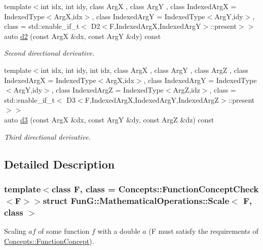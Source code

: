 \begin{DoxyCompactItemize}
{\footnotesize template$<$int idx, int idy, class Arg\-X , class Arg\-Y , class Indexed\-Arg\-X  = Indexed\-Type$<$\-Arg\-X,idx$>$, class Indexed\-Arg\-Y  = Indexed\-Type$<$\-Arg\-Y,idy$>$, class  = std\-::enable\-\_\-if\-\_\-t$<$ D2$<$\-F,\-Indexed\-Arg\-X,\-Indexed\-Arg\-Y$>$\-::present$>$$>$ }\\auto \hyperlink{structFunG_1_1MathematicalOperations_1_1Scale_a8be2b6ba1a541617acd73136467c938d}{d2} (const Arg\-X \&dx, const Arg\-Y \&dy) const 
\begin{DoxyCompactList}\small\item\em Second directional derivative. \end{DoxyCompactList}\item 
{\footnotesize template$<$int idx, int idy, int idz, class Arg\-X , class Arg\-Y , class Arg\-Z , class Indexed\-Arg\-X  = Indexed\-Type$<$\-Arg\-X,idx$>$, class Indexed\-Arg\-Y  = Indexed\-Type$<$\-Arg\-Y,idy$>$, class Indexed\-Arg\-Z  = Indexed\-Type$<$\-Arg\-Z,idz$>$, class  = std\-::enable\-\_\-if\-\_\-t$<$ D3$<$\-F,\-Indexed\-Arg\-X,\-Indexed\-Arg\-Y,\-Indexed\-Arg\-Z$>$\-::present $>$$>$ }\\auto \hyperlink{structFunG_1_1MathematicalOperations_1_1Scale_a070452119b00f2983a6e7ff7fdf890ed}{d3} (const Arg\-X \&dx, const Arg\-Y \&dy, const Arg\-Z \&dz) const 
\begin{DoxyCompactList}\small\item\em Third directional derivative. \end{DoxyCompactList}\end{DoxyCompactItemize}


\subsection{Detailed Description}
\subsubsection*{template$<$class F, class = Concepts\-::\-Function\-Concept\-Check$<$\-F$>$$>$struct Fun\-G\-::\-Mathematical\-Operations\-::\-Scale$<$ F, class $>$}

Scaling $ af $ of some function $ f $ with a double $ a $ (F must satisfy the requirements of \hyperlink{structFunG_1_1Concepts_1_1FunctionConcept}{Concepts\-::\-Function\-Concept}). 

